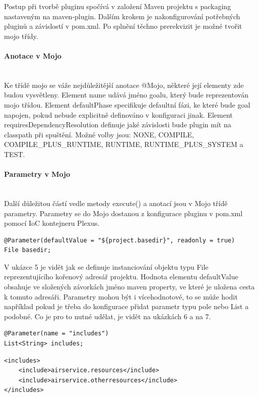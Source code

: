 \documentclass[11pt,twoside,a4paper]{book}
\begin{document}
Postup při tvorbě pluginu spočívá v založení Maven projektu s packaging nastaveným na
maven-plugin. Dalším krokem je nakonfigurování potřebných pluginů a závislostí v pom.xml.
Po splnění těchno prerekvizit je možné tvořit mojo třídy.

\paragraph{Anotace v Mojo}
\mbox{}\\

Ke třídě mojo se váže nejdůležitější anotace @Mojo, některé její elementy zde budou
vysvětleny. Element name udává jméno goalu, který bude reprezentován mojo třídou.
Element defaultPhase specifikuje defaultní fázi, ke které bude goal napojen, pokud nebude
explicitně definováno v konfiguraci jinak. Element requiresDependencyResolution definuje
jaké závislosti bude plugin mít na classpath při spuštění. Možné volby jsou: NONE,
COMPILE, COMPILE_PLUS_RUNTIME, RUNTIME, RUNTIME_PLUS_SYSTEM a
TEST.

\paragraph{Parametry v Mojo}
\mbox{}\\

Další důležitou částí vedle metody execute() a anotací jsou v Mojo třídě parametry. Parametry
se do Mojo dostanou z konfigurace pluginu v pom.xml pomocí IoC kontejneru Plexus.

\begin{lstlisting}[frame=single]
@Parameter(defaultValue = "${project.basedir}", readonly = true)
File basedir;
\end{lstlisting}

V ukázce 5 je vidět jak se definuje instanciování objektu typu File reprezentujícího kořenový
adresář projektu. Hodnota elementu defaultValue obsahuje ve složených závorkách jméno
maven property, ve které je uložena cesta k tomuto adresáři. Parametry mohou být i
vícehodnotové, to se může hodit například pokud je třeba do konfigurace přidat parametr typu
pole nebo List a podobné. Co je pro to nutné udělat, je vidět na ukázkách 6 a na 7.

\begin{lstlisting}[frame=single]
@Parameter(name = "includes")
List<String> includes;
\end{lstlisting}

\begin{lstlisting}[frame=single]
<includes>
    <include>airservice.resources</include>
    <include>airservice.otherresources</include>
</includes>
\end{lstlisting}
\end{document}
